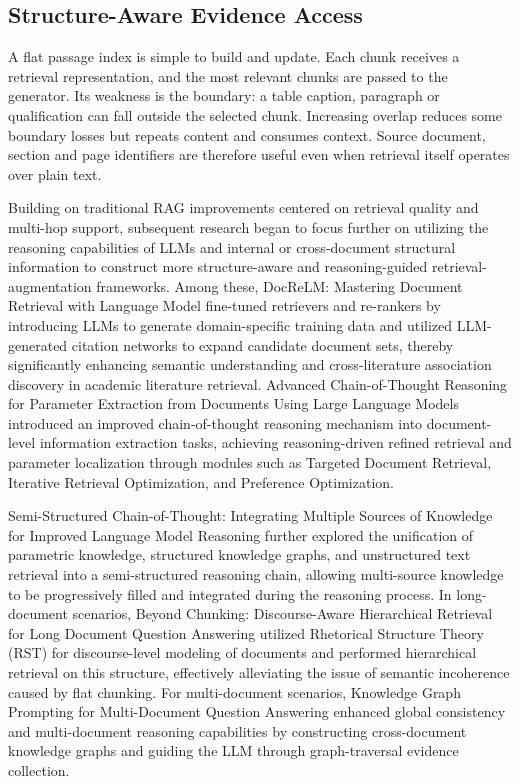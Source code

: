 \subsection{Structure-Aware Evidence Access}

A flat passage index is simple to build and update. Each chunk receives a retrieval representation, and the most relevant chunks are passed to the generator. Its weakness is the boundary: a table caption, paragraph or qualification can fall outside the selected chunk. Increasing overlap reduces some boundary losses but repeats content and consumes context. Source document, section and page identifiers are therefore useful even when retrieval itself operates over plain text.

Building on traditional RAG improvements centered on retrieval quality and multi-hop support, subsequent research began to focus further on utilizing the reasoning capabilities of LLMs and internal or cross-document structural information to construct more structure-aware and reasoning-guided retrieval-augmentation frameworks. Among these, DocReLM: Mastering Document Retrieval with Language Model \cite{wei2024docrelm} fine-tuned retrievers and re-rankers by introducing LLMs to generate domain-specific training data and utilized LLM-generated citation networks to expand candidate document sets, thereby significantly enhancing semantic understanding and cross-literature association discovery in academic literature retrieval. Advanced Chain-of-Thought Reasoning for Parameter Extraction from Documents Using Large Language Models \cite{chen2025advanced} introduced an improved chain-of-thought reasoning mechanism into document-level information extraction tasks, achieving reasoning-driven refined retrieval and parameter localization through modules such as Targeted Document Retrieval, Iterative Retrieval Optimization, and Preference Optimization.

Semi-Structured Chain-of-Thought: Integrating Multiple Sources of Knowledge for Improved Language Model Reasoning \cite{su2024semi} further explored the unification of parametric knowledge, structured knowledge graphs, and unstructured text retrieval into a semi-structured reasoning chain, allowing multi-source knowledge to be progressively filled and integrated during the reasoning process. In long-document scenarios, Beyond Chunking: Discourse-Aware Hierarchical Retrieval for Long Document Question Answering \cite{chen2025chunkingdiscourseawarehierarchicalretrieval} utilized Rhetorical Structure Theory (RST) for discourse-level modeling of documents and performed hierarchical retrieval on this structure, effectively alleviating the issue of semantic incoherence caused by flat chunking. For multi-document scenarios, Knowledge Graph Prompting for Multi-Document Question Answering \cite{wang2024knowledge} enhanced global consistency and multi-document reasoning capabilities by constructing cross-document knowledge graphs and guiding the LLM through graph-traversal evidence collection.


